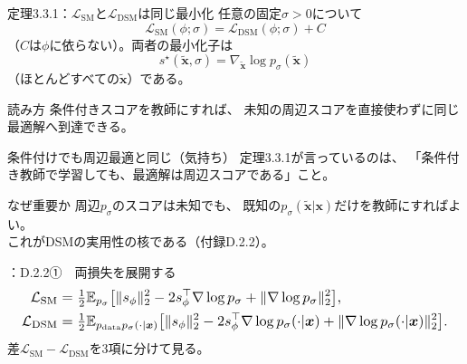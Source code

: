 \asmain
\begin{frame}{定理3.3.1：$\mathcal{L}_{\mathrm{SM}}$と$\mathcal{L}_{\mathrm{DSM}}$は同じ最小化}
    任意の固定$\sigma>0$について
    \[
        \mathcal{L}_{\mathrm{SM}}(\phi;\sigma)
        =
        \mathcal{L}_{\mathrm{DSM}}(\phi;\sigma)+C
        \tag{3.3.3}
    \]
    （$C$は$\phi$に依らない）。両者の最小化子は
    \[
        s^{\star}(\tilde{\bm{x}},\sigma)
        =
        \nabla_{\tilde{\bm{x}}}\log p_{\sigma}(\tilde{\bm{x}})
    \]
    （ほとんどすべての$\tilde{\bm{x}}$）である。
    \begin{block}{読み方}
        条件付きスコアを教師にすれば、
        未知の周辺スコアを直接使わずに同じ最適解へ到達できる。
    \end{block}
\end{frame}
\assuppl
\begin{frame}{条件付けでも周辺最適と同じ（気持ち）}
    定理3.3.1が言っているのは、
    「条件付き教師で学習しても、最適解は周辺スコアである」こと。
    \begin{exampleblock}{なぜ重要か}
        周辺$p_\sigma$のスコアは未知でも、
        既知の$p_\sigma(\tilde{\bm{x}}|\bm{x})$だけを教師にすればよい。\\
        これがDSMの実用性の核である（付録D.2.2）。
    \end{exampleblock}
\end{frame}
\assuppl
\begin{frame}{\supplmark：D.2.2①　両損失を展開する}
    \[
        \resizebox{0.98\textwidth}{!}{$
        \begin{aligned}
        \mathcal{L}_{\mathrm{SM}}
        &=
        \tfrac12\mathbb{E}_{p_\sigma}
        \bigl[
        \|s_\phi\|_2^2
        -
        2 s_\phi^{\top}\nabla\log p_\sigma
        +
        \|\nabla\log p_\sigma\|_2^2
        \bigr],\\
        \mathcal{L}_{\mathrm{DSM}}
        &=
        \tfrac12\mathbb{E}_{p_{\mathrm{data}}p_\sigma(\cdot|\bm{x})}
        \bigl[
        \|s_\phi\|_2^2
        -
        2 s_\phi^{\top}\nabla\log p_\sigma(\cdot|\bm{x})
        +
        \|\nabla\log p_\sigma(\cdot|\bm{x})\|_2^2
        \bigr].
        \end{aligned}
        $}
    \]
    差$\mathcal{L}_{\mathrm{SM}}-\mathcal{L}_{\mathrm{DSM}}$を3項に分けて見る。
\end{frame}

